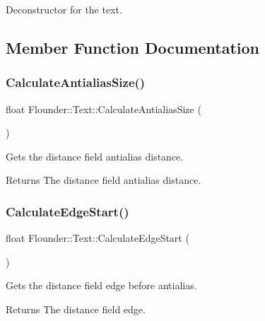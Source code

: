 Deconstructor for the text. 



\subsection{Member Function Documentation}
\mbox{\label{class_flounder_1_1_text_ad4f499c40bd689fe5316b9669276f0da}} 
\subsubsection{\texorpdfstring{Calculate\+Antialias\+Size()}{CalculateAntialiasSize()}}
{\footnotesize\ttfamily float Flounder\+::\+Text\+::\+Calculate\+Antialias\+Size (\begin{DoxyParamCaption}{ }\end{DoxyParamCaption})}



Gets the distance field antialias distance. 

\begin{DoxyReturn}{Returns}
The distance field antialias distance. 
\end{DoxyReturn}
\mbox{\label{class_flounder_1_1_text_a5297a7da9cc3d2b3aa4ee531f52b3c20}} 
\subsubsection{\texorpdfstring{Calculate\+Edge\+Start()}{CalculateEdgeStart()}}
{\footnotesize\ttfamily float Flounder\+::\+Text\+::\+Calculate\+Edge\+Start (\begin{DoxyParamCaption}{ }\end{DoxyParamCaption})}



Gets the distance field edge before antialias. 

\begin{DoxyReturn}{Returns}
The distance field edge. 
\end{DoxyReturn}
\mbox{\label{class_flounder_1_1_text_ac7347bc8128fd715bd1104ece9e983a6}} 
